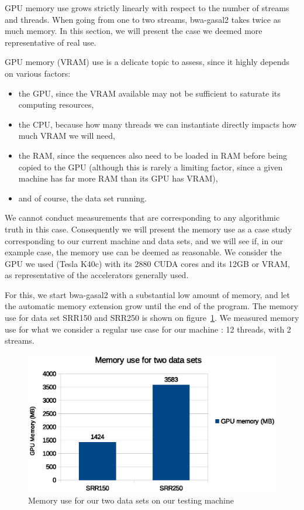 GPU memory use grows strictly linearly with respect to the number of streams and threads. When going from one to two streams, bwa-gasal2 takes twice as much memory. In this section, we will present the case we deemed more representative of real use.

GPU memory (VRAM) use is a delicate topic to assess, since it highly depends on various factors:

\begin{itemize}
	\item the GPU, since the VRAM available may not be sufficient to saturate its computing resources,
	\item the CPU, because how many threads we can instantiate directly impacts how much VRAM we will need,
	\item the RAM, since the sequences also need to be loaded in RAM before being copied to the GPU (although this is rarely a limiting factor, since a given machine has far more RAM than its GPU has VRAM),
	\item and of course, the data set running.
\end{itemize}

We cannot conduct measurements that are corresponding to any algorithmic truth in this case. Consequently we will present the memory use as a case study corresponding to our current machine and data sets, and we will see if, in our example case, the memory use can be deemed as reasonable. We consider the GPU we used (Tesla K40c) with its 2880 CUDA cores and its 12GB or VRAM, as representative of the accelerators generally used.

For this, we start bwa-gasal2 with a substantial low amount of memory, and let the automatic memory extension grow until the end of the program. The memory use for data set SRR150 and SRR250 is shown on figure~\ref{fig:memory-use}. We measured memory use for what we consider a regular use case for our machine : 12 threads, with 2 streams. 

\begin{figure}[h]
	\centering
	\includegraphics[width=0.9\linewidth]{memory-use}
	\caption{Memory use for our two data sets on our testing machine}
	\label{fig:memory-use}
\end{figure}

